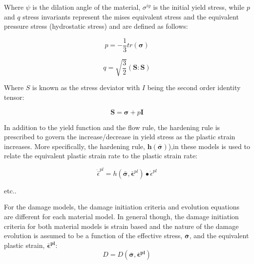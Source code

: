 Where $\psi$ is the dilation angle of the material, $\sigma^{iy}$ is the initial yield stress, while $p$ and $q$ stress invariants represent the mises
equivalent stress and the equivalent pressure stress (hydrostatic stress) and are defined as follows:

\begin{equation}
p=-\frac{1}{3}tr\left(\boldsymbol{\sigma}\right)\label{eqn:druc3}
\end{equation}

\begin{equation}
q=\sqrt{\frac{3}{2}}\left(\mathbf{S}:\mathbf{S}\right)\label{eqn:druc4}
\end{equation}

Where $S$ is known as the stress deviator with $I$ being the second order identity tensor:

\begin{equation}
\mathbf{S}=\boldsymbol{\sigma}+p\mathbf{I}\label{eqn:druc4-1}
\end{equation}

In addition to the yield function and the flow rule, the hardening rule is prescribed to govern the increase/decrease in yield stress as the plastic strain increases. More specifically, the hardening rule, $\mathbf{h}\left(\bar{\boldsymbol{\sigma}}\right)$),in these models is used to relate the equivalent plastic strain rate to the plastic strain rate: 

\begin{equation}
    \dot{\bar{\epsilon}}^{pl} 
    = 
    h
    \left(
        \bar{\boldsymbol{\sigma}}, \bar{\boldsymbol{\epsilon}}^{pl}
    \right)
    \bullet \dot{\epsilon}^{pl}
\label{eqn:const8d}
\end{equation}

etc..

For the damage models, the damage initiation criteria and evolution equations are different for each material model. In general though, the damage initiation criteria for both material models is strain based and the nature of the damage evolution is assumed to be a function of the effective stress, $\boldsymbol{\bar{\sigma}}$, and the equivalent plastic strain, $\boldsymbol{\bar{\epsilon}^{pl}}$:
\begin{equation}
D=D(\boldsymbol{\bar{\sigma}},\boldsymbol{\bar{\epsilon}^{pl}})\label{eqn:const8}
\end{equation}



